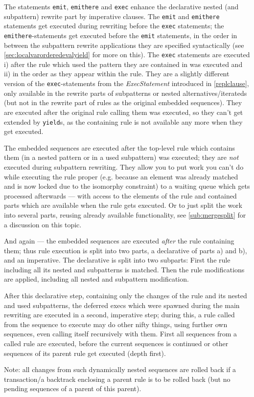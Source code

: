 The statements \texttt{emit}, \texttt{emithere} and \texttt{exec} enhance the declarative nested (and subpattern) rewrite part by imperative clauses.
The \texttt{emit} and \texttt{emithere} statements get executed during rewriting before the \texttt{exec} statements;
the \texttt{emithere}-statements get executed before the \texttt{emit} statements,
in the order in between the subpattern rewrite applications they are specified syntactically
(see \ref{sec:localvarorderedevalyield} for more on this).
The \texttt{exec} statements are executed i) after the rule which used the pattern they are contained in was executed and ii) in the order as they appear within the rule.
They are a slightly different version of the \texttt{exec}-statements from the \emph{ExecStatement} introduced in \ref{replclause}, only available in the rewrite parts of subpatterns or nested alternatives/iterateds
(but not in the rewrite part of rules as the original embedded sequences).
They are executed after the original rule calling them was executed,
so they can't get extended by \texttt{yield}s,
as the containing rule is not available any more when they get executed.

\begin{note}
The embedded sequences are executed after the top-level rule which contains them (in a nested pattern or in a used subpattern) was executed; they are \emph{not} executed during subpattern rewriting.
They allow you to put work you can't do while executing the rule proper (e.g. because an element was already matched and is now locked due to the isomorphy constraint) to a waiting queue which gets processed afterwards --- with access to the elements of the rule and contained parts which are available when the rule gets executed.
Or to just split the work into several parts, reusing already available functionality, see \ref{sub:mergesplit} for a discussion on this topic.
\end{note}

\begin{warning}
And again --- the embedded sequences are executed \emph{after} the rule containing them;
thus rule execution is split into two parts, a declarative of parts a) and b), and an imperative.
The declarative is split into two subparts:
First the rule including all its nested and subpatterns is matched.
Then the rule modifications are applied, including all nested and subpattern modification.

After this declarative step, containing only the changes of the rule and its nested and used subpatterns,
the deferred execs which were spawned during the main rewriting are executed in a second, imperative step;
during this, a rule called from the sequence to execute may do other nifty things,
using further own sequences, even calling itself recursively with them.
First all sequences from a called rule are executed, before the current sequences is continued or other sequences of its parent rule get executed (depth first).

Note: all changes from such dynamically nested sequences are rolled back if a transaction/a backtrack enclosing a parent rule is to be rolled back (but no pending sequences of a parent of this parent).
\end{warning}

